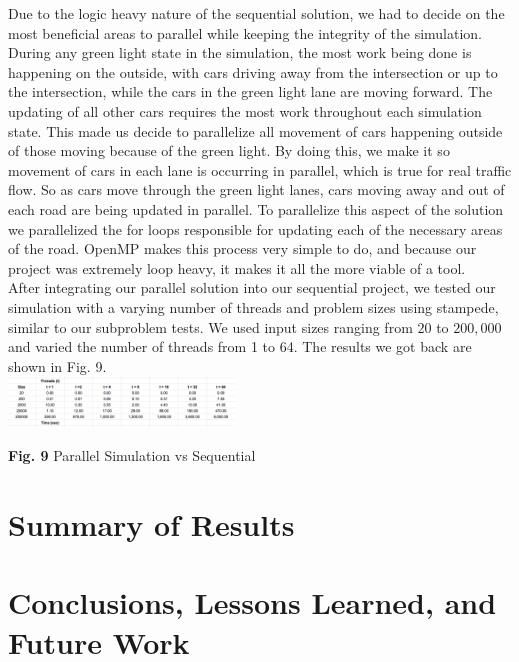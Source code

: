 \documentclass[conference]{IEEEtran}
\begin{document}
\hspace*{.2cm} Due to the logic heavy nature of the sequential solution, we had to decide on the most beneficial areas to parallel while keeping the integrity of the simulation. During any green light state in the simulation, the most work being done is happening on the outside, with cars driving away from the intersection or up to the intersection, while the cars in the green light lane are moving forward. The updating of all other cars requires the most work throughout each simulation state. This made us decide to parallelize all movement of cars happening outside of those moving because of the green light. By doing this, we make it so movement of cars in each lane is occurring in parallel, which is true for real traffic flow. So as cars move through the green light lanes, cars moving away and out of each road are being updated in parallel. To parallelize this aspect of the solution we parallelized the for loops responsible for updating each of the necessary areas of the road. OpenMP makes this process very simple to do, and because our project was extremely loop heavy, it makes it all the more viable of a tool. \\

\hspace*{.2cm} After integrating our parallel solution into our sequential project, we tested our simulation with a varying number of threads and problem sizes using stampede, similar to our subproblem tests. We used input sizes ranging from $20$ to $200,000$ and varied the number of threads from 1 to 64. The results we got back are shown in Fig. 9. \\

\includegraphics[width=0.45\textwidth]{results}
\begin{center}
	\textbf{Fig. 9} Parallel Simulation vs Sequential \\
\end{center}



\section{Summary of Results}
\lipsum[4]

\section{Conclusions, Lessons Learned, and Future Work}
\lipsum[5]



\end{document}
